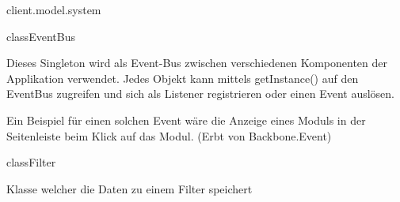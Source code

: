 \begin{texdocpackage}{client.model.system}
\begin{texdocclass}{class}{EventBus}
\label{texdoclet:edu.kit.informatik.studyplan.client.model.system.EventBus}
\begin{texdocclassintro}
Dieses Singleton wird als Event-Bus zwischen verschiedenen Komponenten der
 Applikation verwendet. Jedes Objekt kann mittels getInstance() auf den
 EventBus zugreifen und sich als Listener registrieren oder einen Event
 auslösen.\texdocbr{}

 Ein Beispiel für einen solchen Event wäre die Anzeige eines Moduls in der
 Seitenleiste beim Klick auf das Modul. (Erbt von Backbone.Event)\end{texdocclassintro}
\begin{texdocclassfields}
\end{texdocclassfields}
\begin{texdocclassconstructors}
\end{texdocclassconstructors}
\begin{texdocclassmethods}
\end{texdocclassmethods}
\end{texdocclass}


\begin{texdocclass}{class}{Filter}
\label{texdoclet:edu.kit.informatik.studyplan.client.model.system.Filter}
\begin{texdocclassintro}
Klasse welcher die Daten zu einem Filter speichert\end{texdocclassintro}
\begin{texdocclassfields}
\end{texdocclassfields}
\begin{texdocclassconstructors}
\end{texdocclassconstructors}
\begin{texdocclassmethods}
\end{texdocclassmethods}
\end{texdocclass}



\end{texdocpackage}
